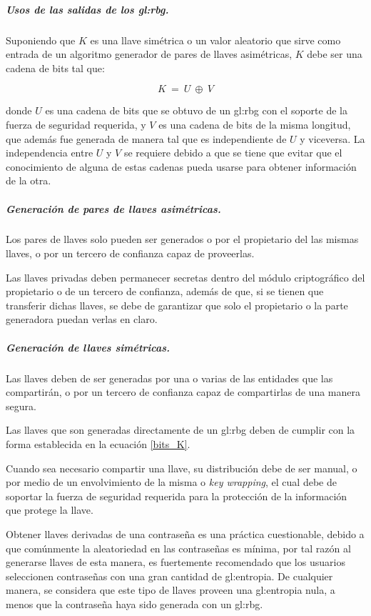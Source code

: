 \subparagraph{Usos de las salidas de los \gls{gl:rbg}.}
Suponiendo que $K$ es una llave simétrica o un valor aleatorio que sirve 
como entrada de un algoritmo generador de pares de llaves asimétricas, $K$ 
debe ser una cadena de bits tal que: 

\begin{equation}
  \label{bits_K}
  K\: =\: U\: \oplus\: V
\end{equation}

donde $U$ es una cadena de bits que se obtuvo de un \gls{gl:rbg} con el 
soporte de la fuerza de seguridad requerida, y $V$ es una cadena de bits de la 
misma longitud, que además fue generada de manera tal que es independiente de 
$U$ y viceversa. La independencia entre $U$ y $V$ se requiere debido a que se 
tiene que evitar que el conocimiento de alguna de estas cadenas pueda usarse 
para obtener información de la otra.

\subparagraph{Generación de pares de llaves asimétricas.}
Los pares de llaves solo pueden ser generados o por el propietario del las 
mismas llaves, o por un tercero de confianza capaz de proveerlas.

Las llaves privadas deben permanecer secretas dentro del módulo criptográfico 
del propietario o de un tercero de confianza, además de que, si se tienen que 
transferir dichas llaves, se debe de garantizar que solo el propietario o la 
parte generadora puedan verlas en claro.

\subparagraph{Generación de llaves simétricas.}
Las llaves deben de ser generadas por una o varias de las entidades que 
las compartirán, o por un tercero de confianza capaz de compartirlas de una 
manera segura. 

Las llaves que son generadas directamente de un \gls{gl:rbg} deben de cumplir 
con la forma establecida en la ecuación \ref{bits_K}.

Cuando sea necesario compartir una llave, su distribución debe de ser manual, 
o por medio de un envolvimiento de la misma o \textit{key wrapping}, el cual 
debe de soportar la fuerza de seguridad requerida para la protección de la 
información que protege la llave.

Obtener llaves derivadas de una contraseña es una práctica cuestionable, 
debido a que comúnmente la aleatoriedad en las contraseñas es mínima, por tal 
razón al generarse llaves de esta manera, es fuertemente recomendado que los 
usuarios seleccionen contraseñas con una gran cantidad de \gls{gl:entropia}. 
De cualquier manera, se considera que este tipo de llaves proveen una 
\gls{gl:entropia} nula, a menos que la contraseña haya sido generada con 
un \gls{gl:rbg}.

